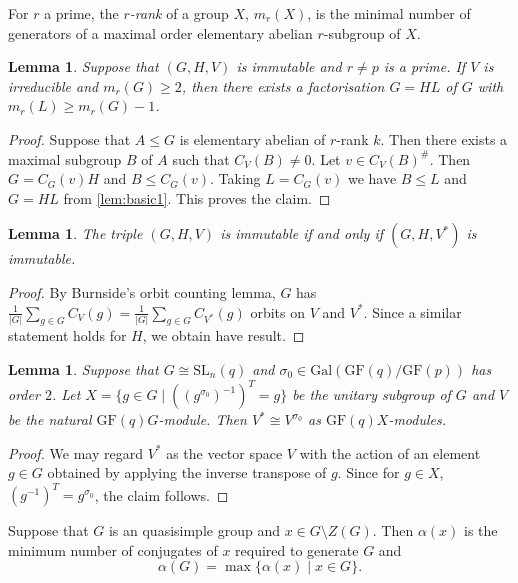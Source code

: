 \documentclass[12pt]{amsart}
\newtheorem{lemma}[theorem]{Lemma}
\theoremstyle{remark}
\theoremstyle{notation}
\theoremstyle{definition}
\newcommand{\GF}{\mathrm{GF}}
\newcommand{\SL}{\mathrm{SL}}
\newcommand{\0}{\emptyset}
\begin{document}
For $r$ a prime, the \emph{$r$-rank} of a group $X$, $m_r(X)$, is the minimal number of generators of a maximal order elementary abelian $r$-subgroup of $X$.

\begin{lemma}\label{lem:prank} Suppose that $(G,H,V)$ is immutable and  $r\ne p$ is a prime.  If  $V$ is irreducible and $m_r(G) \ge 2$, then there exists a factorisation $G= HL$ of $G$ with $m_r(L) \ge m_r(G)-1$.
\end{lemma}

\begin{proof}
Suppose that $A \le G$ is elementary abelian of $r$-rank $k$. Then there exists a maximal subgroup $B$ of $A$ such that $C_V(B) \ne 0$. Let $v \in C_V(B)^\#$. Then $G= C_G(v)H$ and $B \le C_G(v)$. Taking $L=C_G(v)$ we have $B\le L$ and $G=HL$ from \cref{lem:basic1}.  This proves the claim.
\end{proof}




\begin{lemma}\label{lem:Dual same number orbits}  The triple  $(G,H,V)$ is immutable if and only if  $(G,H,V^*)$ is immutable.
\end{lemma}\begin{proof}
By Burnside's orbit counting lemma, $G$ has $\frac{1}{|G|}\sum_{g\in G} C_V(g)= \frac{1}{|G|}\sum_{g\in G} C_{V^*}(g)$ orbits on $V$ and $V^*$. Since a similar statement holds for $H$, we obtain have result.
\end{proof}



\begin{lemma}\label{unitary sbgrp} Suppose that $G \cong \SL_n(q)$ and $\sigma_0 \in \mathrm{Gal}(\GF(q)/\GF(p))$ has order $2$. Let $X=\{g\in G\mid (( g^{\sigma_0})^{-1})^T= g\}$ be the unitary subgroup of $G$ and $V$ be the natural $\GF(q)G$-module.  Then $V^*\cong V^{\sigma_0}$ as $\GF(q)X$-modules.
\end{lemma}

\begin{proof}
We may regard $V^*$ as the vector space $V$ with the action of an element $g \in G$ obtained by applying the inverse transpose of $g$.  Since for $g \in X$, $(g^{-1})^T=g^{\sigma_0}$, the claim follows.
\end{proof}




Suppose that $G$ is an   quasisimple group and $x \in G \setminus Z(G)$.  Then $\alpha (x)$ is the minimum number of conjugates of $x$ required to generate $G$ and $$\alpha(G)= \max\{\alpha(x)\mid x \in G\}.$$
\end{document}
